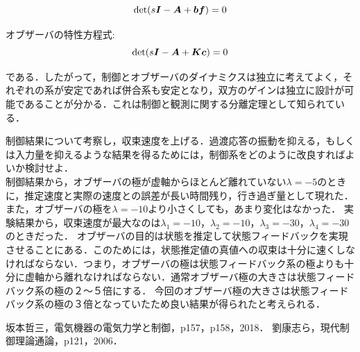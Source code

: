 \documentclass[12pt]{jsarticle}
\begin{document}
\begin{description}
\begin{description}
    \begin{equation}
      {\rm det}(s{\bm I} - {\bm A} + {\bm b}{\bm f}) = 0
    \end{equation}
    \item オブザーバの特性方程式:
    \begin{equation}
      {\rm det}(s{\bm I} - {\bm A} + {\bm K}{\bm c}) = 0
    \end{equation}
  \end{description}
である．したがって，制御とオブザーバのダイナミクスは独立に考えてよく，それぞれの系が安定であれば併合系も安定となり，双方のゲインは独立に設計が可能であることが分かる．これは制御と観測に関する分離定理として知られている\cite{bibitemMechatoronics}．

  \item[(2)] 制御結果について考察し，収束速度を上げる．過渡応答の振動を抑える，もしくは入力量を抑えるような結果を得るためには，制御系をどのように改良すればよいか検討せよ．\\
  制御結果から，オブザーバの極が虚軸からほとんど離れていない$\lambda=-5$のときに，推定速度と実際の速度との誤差が長い時間残り，行き過ぎ量として現れた．また，オブザーバの極を$\lambda=-10$より小さくしても，あまり変化はなかった．
  実験結果から，収束速度が最大なのは$\lambda_1=-10$，$\lambda_2=-10$，$\lambda_3=-30$，$\lambda_4=-30$のときだった．
  オブザーバの目的は状態を推定して状態フィードバックを実現させることにある．このためには，状態推定値の真値への収束は十分に速くしなければならない．つまり，オブザーバの極は状態フィードバック系の極よりも十分に虚軸から離れなければならない．通常オブザーバ極の大きさは状態フィードバック系の極の２〜５倍にする\cite{bibitemGendai}．
  今回のオブザーバ極の大きさは状態フィードバック系の極の３倍となっていたため良い結果が得られたと考えられる．
\end{description}

\begin{thebibliography}{9}
   坂本哲三，電気機器の電気力学と制御，p157，p158，2018．
   劉康志ら，現代制御理論通論，p121，2006．
\end{thebibliography}
\end{document}
